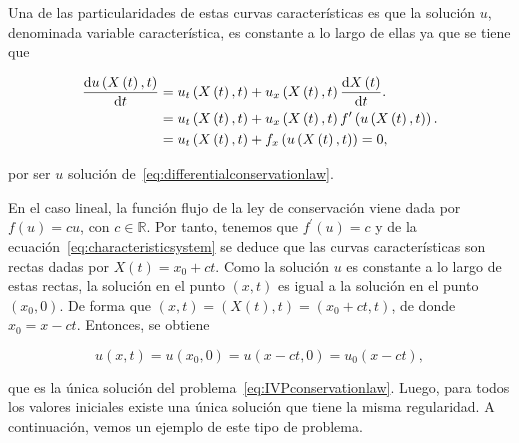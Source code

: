 Una de las particularidades de estas curvas características es que la
solución $u$, denominada variable característica, es constante a lo
largo de ellas ya que se tiene que

\begin{align*}
  \diff{
    u
    \left(
    X\left(t\right),t
    \right)
  }{t} & =
  u_{t}
  \left(
  X\left(t\right),t
  \right)+
  u_{x}
  \left(
  X\left(t\right),t
  \right)
  \diff{X\left(t\right)}{t}. \\
       & =
  u_{t}
  \left(
  X\left(t\right),t
  \right)+
  u_{x}
  \left(
  X\left(t\right),t
  \right)
  f^{\prime}
  \left(
  u\left(X\left(t\right),t\right)
  \right).                   \\
       & =
  u_{t}
  \left(
  X\left(t\right),t
  \right)+
  f_{x}
  \left(
  u\left(X\left(t\right),t\right)
  \right)=
  0,
\end{align*}

por ser $u$ solución de~\eqref{eq:differentialconservationlaw}.

En el caso lineal, la función flujo de la ley de conservación viene
dada por $f\left(u\right)=cu$, con $c\in\mathbb{R}$.
Por tanto, tenemos que $f^{\prime}\left(u\right)=c$ y de la
ecuación~\eqref{eq:characteristicsystem} se deduce que las curvas
características son rectas dadas por $X\left(t\right)=x_{0}+ct$.
Como la solución $u$ es constante a lo largo de estas rectas, la
solución en el punto $\left(x,t\right)$ es igual a la solución en el
punto $\left(x_{0},0\right)$.
De forma que
\begin{math}
  \left(x,t\right)=
  \left(
  X\left(t\right),t
  \right)=
  \left(x_0+ct,t\right)
\end{math},
de donde $x_{0}=x-ct$.
Entonces, se obtiene

\begin{equation}\label{eq:solutionadvection}
  u\left(x,t\right)=
  u\left(x_{0},0\right)=
  u\left(x-ct,0\right)=
  u_{0}\left(x-ct\right),
\end{equation}

que es la única solución del problema~\eqref{eq:IVPconservationlaw}.
Luego, para todos los valores iniciales existe una única solución que
tiene la misma regularidad.
A continuación, vemos un ejemplo de este tipo de problema.

